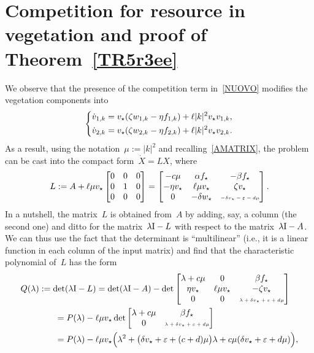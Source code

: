 \documentclass[12pt]{amsart}
\renewcommand{\epsilon}{\varepsilon}
\numberwithin{equation}{section}
\begin{document}
\section{Competition for resource in vegetation and proof of Theorem~\ref{TR5r3ee}}\label{TR5r3eeS}

We observe that the presence of the competition term in~\eqref{NUOVO} modifies the vegetation components %
into
\begin{equation*}
\begin{dcases}
\dot v_{1,k}=v_\star(\zeta w_{1,k}-\eta f_{1,k} )+\ell |k|^2 v_\star v_{1,k},\\
\dot v_{2,k}=v_\star(\zeta w_{2,k}-\eta f_{2,k})+\ell |k|^2 v_\star  v_{2,k} .
\end{dcases}
\end{equation*}
As a result, using the notation~$\mu:=|k|^2$ and
recalling~\eqref{AMATRIX}, the problem can be cast into
the compact form~$\dot X= LX$, where
\begin{equation}\label{pkdweLL} L:=
A+\ell\mu v_\star
\begin{bmatrix}
0&0&0 \\0&1&0\\
0&0&0
\end{bmatrix}
=
\begin{bmatrix}
-c\mu & \alpha f_\star & -\beta f_\star \\
-\eta v_\star &\ell\mu v_\star&\zeta v_\star\\
0&-\delta w_\star &\tiny{\mbox{$-\delta v_\star -\epsilon -d\mu$}}
\end{bmatrix}.\end{equation}
In a nutshell, the matrix~$L$ is obtained from~$A$ by adding, say, a column (the second one)
and ditto for the matrix~$\lambda{\rm I}-L$ with respect to the matrix~$\lambda{\rm I}-A$.
We can thus use the fact that the determinant is ``multilinear'' (i.e., it is a linear function in each column of the input matrix) and find that
the characteristic polynomial of~$L$ has the form
\begin{equation}\label{qi0dwfuojvrbthwq8nc7rvtb9mA}\begin{split}&
Q(\lambda):=\det(\lambda{\rm I}-L)=
\det(\lambda{\rm I}-A)-\det
\begin{bmatrix}
\lambda+c\mu & 0 & \beta f_\star \\
\eta v_\star &\ell\mu v_\star&-\zeta v_\star\\
0&0 &\tiny{\mbox{$\lambda+\delta v_\star +\epsilon +d\mu$}}
\end{bmatrix}\\&\qquad\qquad=P(\lambda)-\ell\mu v_\star \det
\begin{bmatrix}
\lambda+c\mu & \beta f_\star \\
0 &\tiny{\mbox{$\lambda+\delta v_\star +\epsilon +d\mu$}}
\end{bmatrix}\\&\qquad\qquad=P(\lambda)-\ell\mu v_\star\Big(
\lambda^2 + \big( \delta v_\star + \epsilon + (c + d) \mu\big) \lambda
+c \mu ( \delta v_\star+ \epsilon + d \mu) \Big),\end{split}\end{equation}
\end{document}
